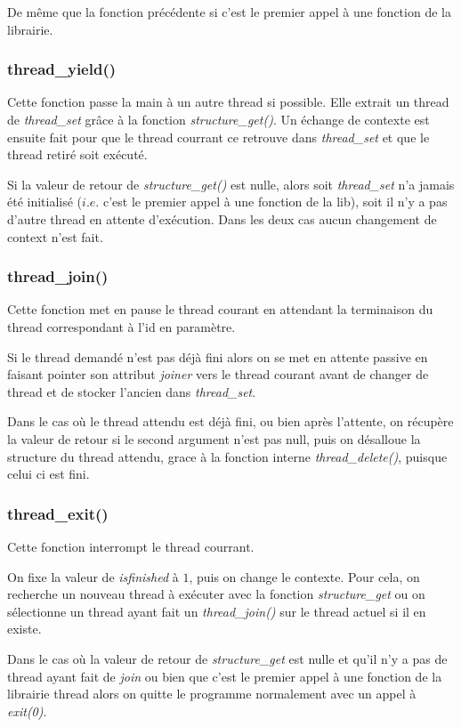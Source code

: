 De même que la fonction précédente si c'est le
premier appel à une fonction de la librairie.



\subsubsection{thread\_yield()}
Cette fonction passe la main à un autre thread si possible. Elle
extrait un thread de \textit{thread\_set} grâce à la fonction
\textit{structure\_get()}. Un échange de contexte est
ensuite fait pour que le thread courrant ce retrouve dans
\textit{thread\_set} et que le thread retiré soit exécuté.

Si la valeur de retour de \textit{structure\_get()} est nulle, alors
soit \textit{thread\_set} n'a jamais été initialisé ($i.e.$ c'est le
premier appel à une fonction de la lib), soit il n'y a pas d'autre
thread en attente d'exécution. Dans les deux cas aucun changement de
context n'est fait.

\subsubsection{thread\_join()}
Cette fonction met en pause le thread courant en attendant la
terminaison du thread correspondant à l'id en paramètre.

Si le thread demandé n'est pas déjà fini alors on se met en attente
passive en faisant pointer son attribut \textit{joiner} vers le thread
courant avant de changer de thread et de stocker l'ancien dans
\textit{thread\_set}.

Dans le cas où le thread attendu est déjà fini, ou bien après
l'attente, on récupère la valeur de retour si le second argument n'est
pas null, puis on désalloue la structure du thread attendu, grace à la
fonction interne \textit{thread\_delete()}, puisque celui ci est fini.


\subsubsection{thread\_exit()}
Cette fonction interrompt le thread courrant.

On fixe la valeur de \textit{isfinished} à $1$, puis on change le
contexte. Pour cela, on recherche un nouveau thread à exécuter avec la
fonction \textit{structure\_get} ou on sélectionne un
thread ayant fait un \textit{thread\_join()} sur le thread actuel si
il en existe.

Dans le cas où la valeur de retour de \textit{structure\_get} est
nulle et qu'il n'y a pas de thread ayant fait de \textit{join} ou bien
que c'est le premier appel à une fonction de la librairie thread alors
on quitte le programme normalement avec un appel à \textit{exit(0)}.


